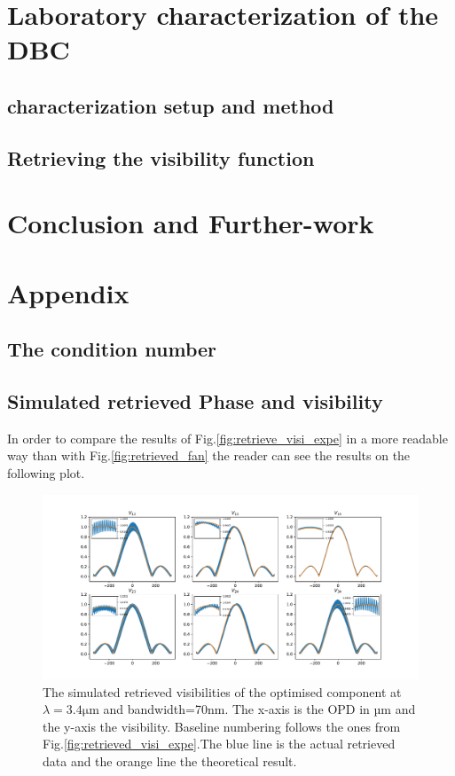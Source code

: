 \documentclass[a4paper,twoside,11pt]{article}
\makeatletter
\newcommand\backmatter{%
  \if@openright
    \clearpage
  \else
    \clearpage
  \fi
   }
\makeatother
\begin{document}
\section{Laboratory characterization of the DBC}

    \subsection{characterization setup and method}
    
    \subsection{Retrieving the visibility function}
    
    
\section*{Conclusion and Further-work}

\backmatter
\appendix
\section{Appendix}
    \subsection{The condition number}\label{an:cond}
    
\newpage
    \subsection{Simulated retrieved Phase and visibility}\label{an:retriev}
    In order to compare the results of Fig.\ref{fig:retrieve_visi_expe} in a more readable way than with Fig.\ref{fig:retrieved_fan} the reader can see the results on the following plot.
    \begin{figure}[htbp!]
     \centering
     \includegraphics[scale=.4]{../picture/retrieve_visi_simu.pdf}
     \caption{The simulated retrieved visibilities of the optimised component at $\lambda=3.4\si{\micro\meter}$ and bandwidth=70nm. The x-axis is the OPD in µm and the y-axis the visibility. Baseline numbering follows the ones from Fig.\ref{fig:retrieved_visi_expe}.The blue line is the actual retrieved data and the orange line the theoretical result.}
     \label{an:retrieved_visi_simu}
    \end{figure}
    
\end{document}
